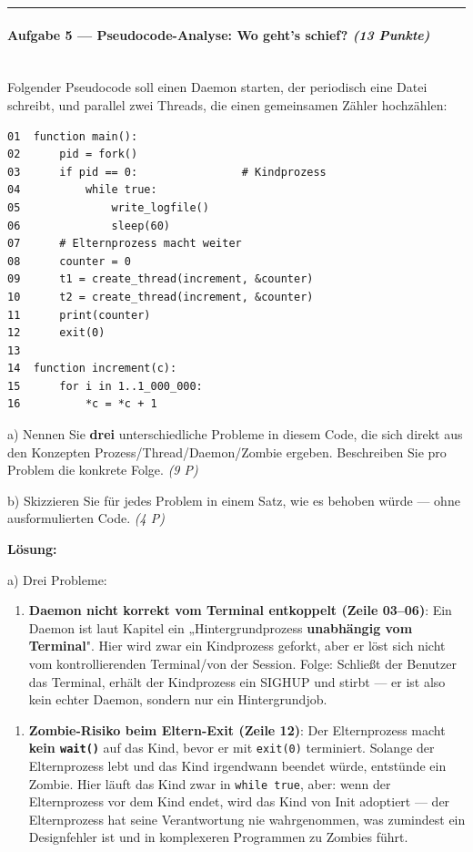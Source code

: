 \documentclass[11pt, a4paper]{article}
\begin{document}
\noindent\textcolor{rulegray}{\rule{\linewidth}{0.4pt}}


\paragraph{Aufgabe 5 — Pseudocode-Analyse: Wo geht's schief? \textit{(13 Punkte)}}\mbox{}\\[2pt]

Folgender Pseudocode soll einen Daemon starten, der periodisch eine Datei schreibt, und parallel zwei Threads, die einen gemeinsamen Zähler hochzählen:


\begin{lstlisting}
01  function main():
02      pid = fork()
03      if pid == 0:                # Kindprozess
04          while true:
05              write_logfile()
06              sleep(60)
07      # Elternprozess macht weiter
08      counter = 0
09      t1 = create_thread(increment, &counter)
10      t2 = create_thread(increment, &counter)
11      print(counter)
12      exit(0)
13
14  function increment(c):
15      for i in 1..1_000_000:
16          *c = *c + 1
\end{lstlisting}


a) Nennen Sie \textbf{drei} unterschiedliche Probleme in diesem Code, die sich direkt aus den Konzepten Prozess/Thread/Daemon/Zombie ergeben. Beschreiben Sie pro Problem die konkrete Folge. \textit{(9 P)}


b) Skizzieren Sie für jedes Problem in einem Satz, wie es behoben würde — ohne ausformulierten Code. \textit{(4 P)}


\textbf{Lösung:}


a) Drei Probleme:


\begin{enumerate}
  \item \textbf{Daemon nicht korrekt vom Terminal entkoppelt (Zeile 03–06)}: Ein Daemon ist laut Kapitel ein „Hintergrundprozess \textbf{unabhängig vom Terminal}". Hier wird zwar ein Kindprozess geforkt, aber er löst sich nicht vom kontrollierenden Terminal/von der Session. Folge: Schließt der Benutzer das Terminal, erhält der Kindprozess ein SIGHUP und stirbt — er ist also kein echter Daemon, sondern nur ein Hintergrundjob.
\end{enumerate}

\begin{enumerate}
  \item \textbf{Zombie-Risiko beim Eltern-Exit (Zeile 12)}: Der Elternprozess macht \textbf{kein \texttt{wait()}} auf das Kind, bevor er mit \texttt{exit(0)} terminiert. Solange der Elternprozess lebt und das Kind irgendwann beendet würde, entstünde ein Zombie. Hier läuft das Kind zwar in \texttt{while true}, aber: wenn der Elternprozess vor dem Kind endet, wird das Kind von Init adoptiert — der Elternprozess hat seine Verantwortung nie wahrgenommen, was zumindest ein Designfehler ist und in komplexeren Programmen zu Zombies führt.
\end{enumerate}
\end{document}
